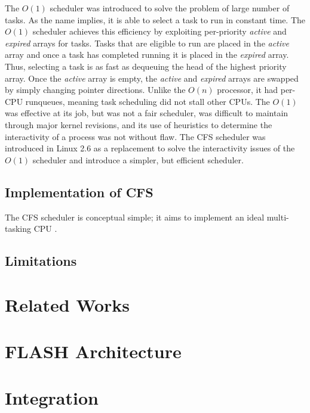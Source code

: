 \documentclass{sig-alternate-10pt}
\begin{document}
The $ O(1) $ scheduler was introduced to solve the problem of large number of tasks. As the name implies, it is able to select a task to run in constant time. The $ O(1) $ scheduler achieves this efficiency by exploiting per-priority \textit{active} and \textit{expired} arrays for tasks. Tasks that are eligible to run are placed in the \textit{active} array and once a task has completed running it is placed in the \textit{expired} array. Thus, selecting a task is as fast as dequeuing the head of the highest priority array. Once the \textit{active} array is empty, the \textit{active} and \emph{expired} arrays are swapped by simply changing pointer directions. Unlike the $ O(n) $ processor, it had per-CPU runqueues, meaning task scheduling did not stall other CPUs. The $ O(1) $ was effective at its job, but was not a fair scheduler, was difficult to maintain through major kernel revisions, and its use of heuristics to determine the interactivity of a process was not without flaw. The CFS scheduler was introduced in Linux 2.6 as a replacement to solve the interactivity issues of the $ O(1) $ scheduler and introduce a simpler, but efficient scheduler.

\subsection{Implementation of CFS}
The CFS scheduler is conceptual simple; it aims to implement an ideal multi-tasking CPU \cite{cfsdesign}.
\subsection{Limitations}


\section{Related Works}
\lipsum[1-2]


\section{FLASH Architecture}
\lipsum[1-8]


\section{Integration}
\end{document}

